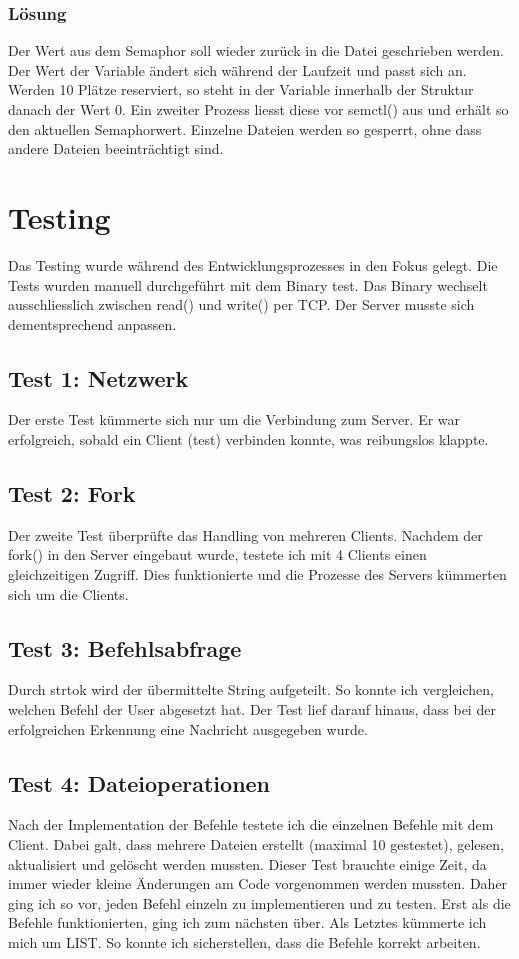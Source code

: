 \documentclass[12pt,a4paper,ngerman]{report}
\begin{document}
\subsubsection{Lösung}
Der Wert aus dem Semaphor soll wieder zurück in die Datei geschrieben werden. Der Wert der Variable ändert sich während der Laufzeit und passt sich an. Werden 10 Plätze reserviert, so steht in der Variable innerhalb der Struktur danach der Wert 0. Ein zweiter Prozess liesst diese vor semctl() aus und erhält so den aktuellen Semaphorwert. Einzelne Dateien werden so gesperrt, ohne dass andere Dateien beeinträchtigt sind.
\section{Testing}
Das Testing wurde während des Entwicklungsprozesses in den Fokus gelegt. Die Tests wurden manuell durchgeführt mit dem Binary test. Das Binary wechselt ausschliesslich zwischen read() und write() per TCP. Der Server musste sich dementsprechend anpassen.
\subsection{Test 1: Netzwerk}
Der erste Test kümmerte sich nur um die Verbindung zum Server. Er war erfolgreich, sobald ein Client (test) verbinden konnte, was reibungslos klappte.
\subsection{Test 2: Fork}
Der zweite Test überprüfte das Handling von mehreren Clients. Nachdem der fork() in den Server eingebaut wurde, testete ich mit 4 Clients einen gleichzeitigen Zugriff. Dies funktionierte und die Prozesse des Servers kümmerten sich um die Clients.
\subsection{Test 3: Befehlsabfrage}
Durch strtok wird der übermittelte String aufgeteilt. So konnte ich vergleichen, welchen Befehl der User abgesetzt hat. Der Test lief darauf hinaus, dass bei der erfolgreichen Erkennung eine Nachricht ausgegeben wurde.
\subsection{Test 4: Dateioperationen}
Nach der Implementation der Befehle testete ich die einzelnen Befehle mit dem Client. Dabei galt, dass mehrere Dateien erstellt (maximal 10 gestestet), gelesen, aktualisiert und gelöscht werden mussten. Dieser Test brauchte einige Zeit, da immer wieder kleine Änderungen am Code vorgenommen werden mussten. Daher ging ich so vor, jeden Befehl einzeln zu implementieren und zu testen. Erst als die Befehle funktionierten, ging ich zum nächsten über. Als Letztes kümmerte ich mich um LIST. So konnte ich sicherstellen, dass die Befehle korrekt arbeiten.
\end{document}

